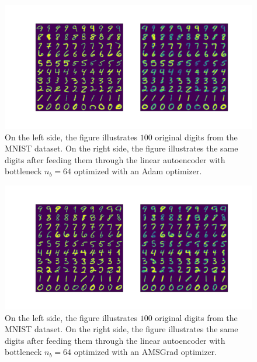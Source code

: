 \begin{figure}
\begin{center}
   \begin{minipage}[b]{\linewidth}
      \includegraphics[trim = 15mm 10mm 15mm 15mm, clip, width=\linewidth]{linear_AE_64d_adam_inference}
	\end{minipage}
\end{center}
\caption{On the left side, the figure illustrates $100$ original digits from the MNIST dataset. On the right side, the figure illustrates the same digits after feeding them through the linear autoencoder with bottleneck $n_b=64$ optimized with an Adam optimizer.}\label{fig:linear_AE_64d_adam_inference}
\end{figure}


\begin{figure}
\begin{center}
   \begin{minipage}[b]{\linewidth}
      \includegraphics[trim = 15mm 10mm 15mm 15mm, clip, width=\linewidth]{linear_AE_64d_amsgrad_inference}
	\end{minipage}
\end{center}
\caption{On the left side, the figure illustrates $100$ original digits from the MNIST dataset. On the right side, the figure illustrates the same digits after feeding them through the linear autoencoder with bottleneck $n_b=64$ optimized with an AMSGrad optimizer.}\label{fig:linear_AE_64d_amsgrad_inference}
\end{figure}



